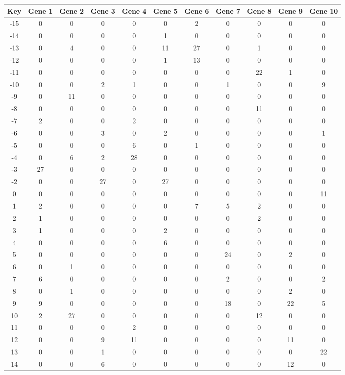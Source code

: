\begin{tabular}{|c|c|c|c|c|c|c|c|c|c|c|}
\hline
Key & Gene 1 & Gene 2 & Gene 3 & Gene 4 & Gene 5 & Gene 6 & Gene 7 & Gene 8 & Gene 9 & Gene 10 \\
\hline
-15 & 0 & 0 & 0 & 0 & 0 & 2 & 0 & 0 & 0 & 0 \\
-14 & 0 & 0 & 0 & 0 & 1 & 0 & 0 & 0 & 0 & 0 \\
-13 & 0 & 4 & 0 & 0 & 11 & 27 & 0 & 1 & 0 & 0 \\
-12 & 0 & 0 & 0 & 0 & 1 & 13 & 0 & 0 & 0 & 0 \\
-11 & 0 & 0 & 0 & 0 & 0 & 0 & 0 & 22 & 1 & 0 \\
-10 & 0 & 0 & 2 & 1 & 0 & 0 & 1 & 0 & 0 & 9 \\
-9 & 0 & 11 & 0 & 0 & 0 & 0 & 0 & 0 & 0 & 0 \\
-8 & 0 & 0 & 0 & 0 & 0 & 0 & 0 & 11 & 0 & 0 \\
-7 & 2 & 0 & 0 & 2 & 0 & 0 & 0 & 0 & 0 & 0 \\
-6 & 0 & 0 & 3 & 0 & 2 & 0 & 0 & 0 & 0 & 1 \\
-5 & 0 & 0 & 0 & 6 & 0 & 1 & 0 & 0 & 0 & 0 \\
-4 & 0 & 6 & 2 & 28 & 0 & 0 & 0 & 0 & 0 & 0 \\
-3 & 27 & 0 & 0 & 0 & 0 & 0 & 0 & 0 & 0 & 0 \\
-2 & 0 & 0 & 27 & 0 & 27 & 0 & 0 & 0 & 0 & 0 \\
0 & 0 & 0 & 0 & 0 & 0 & 0 & 0 & 0 & 0 & 11 \\
1 & 2 & 0 & 0 & 0 & 0 & 7 & 5 & 2 & 0 & 0 \\
2 & 1 & 0 & 0 & 0 & 0 & 0 & 0 & 2 & 0 & 0 \\
3 & 1 & 0 & 0 & 0 & 2 & 0 & 0 & 0 & 0 & 0 \\
4 & 0 & 0 & 0 & 0 & 6 & 0 & 0 & 0 & 0 & 0 \\
5 & 0 & 0 & 0 & 0 & 0 & 0 & 24 & 0 & 2 & 0 \\
6 & 0 & 1 & 0 & 0 & 0 & 0 & 0 & 0 & 0 & 0 \\
7 & 6 & 0 & 0 & 0 & 0 & 0 & 2 & 0 & 0 & 2 \\
8 & 0 & 1 & 0 & 0 & 0 & 0 & 0 & 0 & 2 & 0 \\
9 & 9 & 0 & 0 & 0 & 0 & 0 & 18 & 0 & 22 & 5 \\
10 & 2 & 27 & 0 & 0 & 0 & 0 & 0 & 12 & 0 & 0 \\
11 & 0 & 0 & 0 & 2 & 0 & 0 & 0 & 0 & 0 & 0 \\
12 & 0 & 0 & 9 & 11 & 0 & 0 & 0 & 0 & 11 & 0 \\
13 & 0 & 0 & 1 & 0 & 0 & 0 & 0 & 0 & 0 & 22 \\
14 & 0 & 0 & 6 & 0 & 0 & 0 & 0 & 0 & 12 & 0 \\
\hline
\end{tabular}